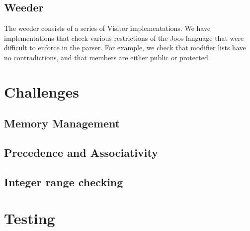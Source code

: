 \documentclass[12pt, titlepage]{article}
\begin{document}
\subsection{Weeder}
The weeder consists of a series of Visitor implementations. We have
implementations that check various restrictions of the Joos language that were
difficult to enforce in the parser. For example, we check that modifier lists
have no contradictions, and that members are either public or protected.

\section{Challenges}
\subsection{Memory Management}
\subsection{Precedence and Associativity}
\subsection{Integer range checking}

\section{Testing}
\end{document}
